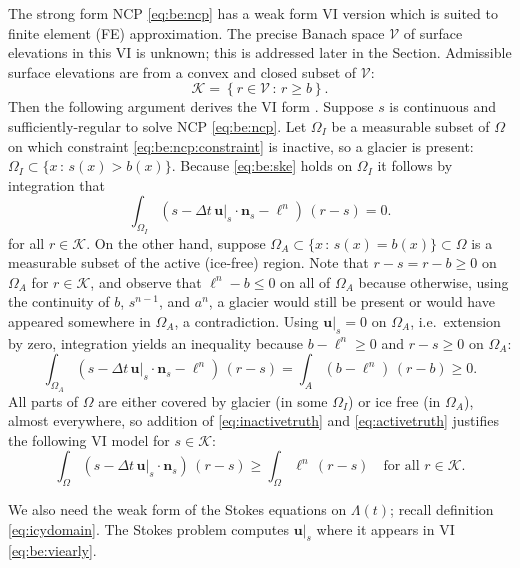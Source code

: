 \documentclass[hidelinks,onefignum,onetabnum,final]{siamart220329}  %
\newcommand{\bn}{\mathbf{n}}
\newcommand{\bu}{\mathbf{u}}
\newcommand{\cK}{\mathcal{K}}
\newcommand{\cV}{\mathcal{V}}
\begin{document}
The strong form NCP \eqref{eq:be:ncp} has a weak form VI version which is suited to finite element (FE) approximation.  The precise Banach space $\cV$ of surface elevations in this VI is unknown; this is addressed later in the Section.  Admissible surface elevations are from a convex and closed subset of $\cV$:
\begin{equation}
\cK = \left\{r \in\cV\,:\,r \ge b\right\}.  \label{eq:be:admissible}
\end{equation}
Then the following argument derives the VI form \cite{Bueler2021conservation}.  Suppose $s$ is continuous and sufficiently-regular to solve NCP \eqref{eq:be:ncp}.  Let $\Omega_I$ be a measurable subset of $\Omega$ on which constraint \eqref{eq:be:ncp:constraint} is inactive, so a glacier is present: $\Omega_I \subset \{x\,:\,s(x)>b(x)\}$.  Because \eqref{eq:be:ske} holds on $\Omega_I$ it follows by integration that
\begin{equation}
\int_{\Omega_I} \left(s - \Delta t\,\bu|_s \cdot \bn_s - \ell^n\right)\,(r-s) = 0.  \label{eq:inactivetruth}
\end{equation}
for all $r\in\cK$.  On the other hand, suppose $\Omega_A \subset \{x\,:\,s(x)=b(x)\} \subset \Omega$ is a measurable subset of the active (ice-free) region.  Note that $r-s=r-b\ge 0$ on $\Omega_A$ for $r\in\cK$, and observe that $\ell^n - b \le 0$ on all of $\Omega_A$ because otherwise, using the continuity of $b$, $s^{n-1}$, and $a^n$, a glacier would still be present or would have appeared somewhere in $\Omega_A$, a contradiction.  Using $\bu|_s=0$ on $\Omega_A$, i.e.~extension by zero, integration yields an inequality because $b-\ell^n \ge 0$ and $r-s\ge 0$ on $\Omega_A$:
\begin{equation}
\int_{\Omega_A} \left(s - \Delta t\,\bu|_s \cdot \bn_s - \ell^n\right)\,(r-s) = \int_A \left(b - \ell^n\right)\,(r-b) \ge 0.  \label{eq:activetruth}
\end{equation}
All parts of $\Omega$ are either covered by glacier (in some $\Omega_I$) or ice free (in $\Omega_A$), almost everywhere, so addition of \eqref{eq:inactivetruth} and \eqref{eq:activetruth} justifies the following VI model for $s \in \cK$:
\begin{equation}
\int_\Omega \left(s - \Delta t\,\bu|_s \cdot \bn_s\right)\,(r-s) \ge \int_\Omega \ell^n \,(r-s) \quad \text{for all } r \in \cK. \label{eq:be:viearly}
\end{equation}
	
We also need the weak form of the Stokes equations on $\Lambda(t)$; recall definition \eqref{eq:icydomain}.  The Stokes problem computes $\bu|_s$ where it appears in VI \eqref{eq:be:viearly}.
\end{document}
